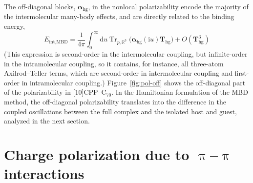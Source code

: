 The off-diagonal blocks, $\boldsymbol\alpha_\text{hg}$, in the nonlocal polarizability encode the majority of the intermolecular many-body effects, and are directly related to the binding energy,
\begin{equation}
  E_\text{int,MBD}=\frac1{4\pi}\int_0^\infty\mathrm du\operatorname{Tr}_{p,\mathbb R^3}\big(\boldsymbol\alpha_\text{hg}(\mathrm iu)\mathbf T_\text{hg}\big)+O(\mathbf T_\text{hg}^3)
\end{equation}
(This expression is second-order in the intermolecular coupling, but infinite-order in the intramolecular coupling, so it contains, for instance, all three-atom Axilrod--Teller terms, which are second-order in intermolecular coupling and first-order in intramolecular coupling.)
Figure~\ref{fig:pol-off} shows the off-diagonal part of the polarizability in [10]CPP--C$_{70}$.
In the Hamiltonian formulation of the MBD method, the off-diagonal polarizability translates into the difference in the coupled oscillations between the full complex and the isolated host and guest, analyzed in the next section.

\section{Charge polarization due to $\uppi$--$\uppi$ interactions}


